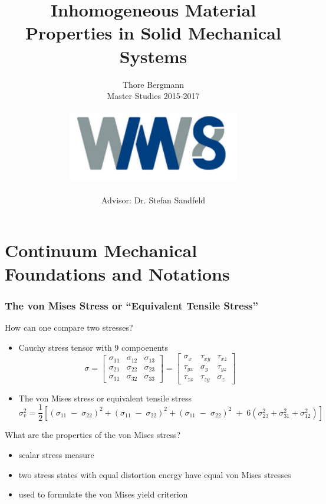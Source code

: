 \documentclass[english]{scrartcl}
\title{Inhomogeneous Material Properties in Solid Mechanical Systems}
\date{Thore Bergmann \\
	Master Studies 2015-2017 \\
	$ {\;} $ \\
	\includegraphics*[height = 3cm]{logo} \\
	$ {\;} $ \\
	Advisor: Dr. Stefan Sandfeld}
\newcommand{\minus}{{\;} - {\;}}
\newcommand{\plus}{{\;} + {\;}}
\newenvironment{myitemize}{ \begin{itemize}
		\setlength{\itemsep}{0pt}
		\setlength{\parskip}{0pt}
		\setlength{\parsep}{0pt}     }
	{ \end{itemize}                  }
\begin{document}
	

\maketitle
\clearpage

\section*{Continuum Mechanical Foundations and Notations}


\subsubsection*{The von Mises Stress or \enquote{Equivalent Tensile Stress}}

How can one compare two stresses?
\begin{myitemize}
	\item Cauchy stress tensor with 9 compoenents
	\begin{equation}
	\sigma = \begin{bmatrix}
	\sigma_{11}	& \sigma_{12}	 & \sigma_{13}	 \\ 
	\sigma_{21}	& \sigma_{22}	 & \sigma_{23}	 \\ 
	\sigma_{31}	& \sigma_{32}	 & \sigma_{33}	
	\end{bmatrix} = \begin{bmatrix}
	\sigma_{x}	& \tau_{xy}	 & \tau_{xz}	 \\ 
	\tau_{yx}	& \sigma_{y}	 & \tau_{yz}	 \\ 
	\tau_{zx}	& \tau_{zy}	 & \sigma_{z}	
	\end{bmatrix} \nonumber
	\end{equation}
	
	\item The von Mises stress or equivalent tensile stress
	\begin{equation}
	\sigma^{2}_{v} = \dfrac{1}{2} \left [ (\sigma_{11} \minus \sigma_{22})^{2} + (\sigma_{11} \minus \sigma_{22})^{2} + (\sigma_{11} \minus \sigma_{22})^{2} \plus 6 ( \sigma^{2}_{23} + \sigma^{2}_{31} + \sigma^{2}_{12}) \right ] \nonumber
	\end{equation}
	
\end{myitemize}

What are the properties of the von Mises stress?
\begin{myitemize}
	\item scalar stress measure
	\item two stress states with equal distortion energy have equal von Mises stresses 
	\item used to formulate the von Mises yield criterion
\end{myitemize}
\end{document}
